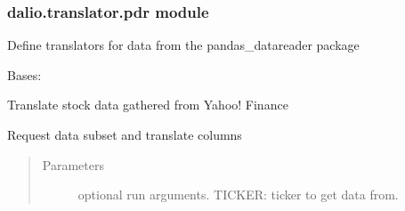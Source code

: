\documentclass[letterpaper,10pt,english]{sphinxmanual}
\begin{document}
\subsubsection{dalio.translator.pdr module}
\label{\detokenize{dalio.translator:module-dalio.translator.pdr}}\label{\detokenize{dalio.translator:dalio-translator-pdr-module}}
Define translators for data from the pandas\_datareader package

\begin{fulllineitems}
\label{\detokenize{dalio.translator:dalio.translator.pdr.YahooStockTranslator}}
Bases: {\hyperref[\detokenize{dalio.translator:dalio.translator.translator.Translator}]{}}

Translate stock data gathered from Yahoo! Finance

\begin{fulllineitems}
\label{\detokenize{dalio.translator:dalio.translator.pdr.YahooStockTranslator.run}}
Request data subset and translate columns
\begin{quote}\begin{description}
\item[{Parameters}] \leavevmode
{} \textendash{} optional run arguments.
TICKER: ticker to get data from.

\end{description}\end{quote}

\end{fulllineitems}


\begin{fulllineitems}
\label{\detokenize{dalio.translator:dalio.translator.pdr.YahooStockTranslator.translations}}
\end{fulllineitems}


\end{fulllineitems}
\end{document}
